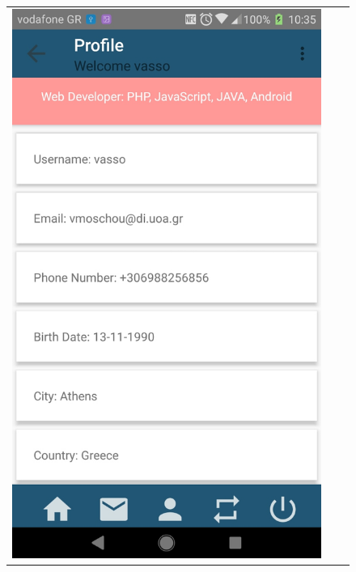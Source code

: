 \documentclass[12pt]{article}
\begin{document}
\begin{center}
\begin{figure}
\begin{tabular}{c c c}
				\includegraphics[scale=0.17, keepaspectratio]{18-profile.jpg}  
				&

\end{tabular}
\end{figure}
\end{center}
\end{document}
